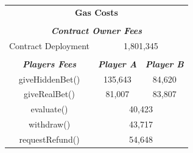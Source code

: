 \documentclass[12pt,a4paper]{article}
\begin{document}
\begin{table}[htpb]
    \begin{center}
        \begin{tabular}{ccc}
        \multicolumn{3}{c}{\textbf{Gas Costs}}                                                                                                                   \\
        \multicolumn{1}{l}{}                                 & \multicolumn{1}{l}{}                            & \multicolumn{1}{l}{}                            \\ \hline
        \multicolumn{3}{|c|}{\textit{\textbf{Contract Owner Fees}}}                                                                                              \\ \hline
        \multicolumn{1}{|c|}{Contract Deployment}            & \multicolumn{2}{c|}{1,801,345}                                                                    \\ \hline
        \multicolumn{1}{l}{}                                 & \multicolumn{1}{l}{}                            & \multicolumn{1}{l}{}                            \\ \hline
        \multicolumn{1}{|c|}{\textit{\textbf{Players Fees}}} & \multicolumn{1}{c|}{\textit{\textbf{Player A}}} & \multicolumn{1}{c|}{\textit{\textbf{Player B}}} \\ \hline
        \multicolumn{1}{|c|}{giveHiddenBet()}                & \multicolumn{1}{c|}{135,643}                    & \multicolumn{1}{c|}{84,620}                     \\ \hline
        \multicolumn{1}{|c|}{giveRealBet()}                  & \multicolumn{1}{c|}{81,007}                     & \multicolumn{1}{c|}{83,807}                     \\ \hline
        \multicolumn{1}{|c|}{evaluate()}                     & \multicolumn{2}{c|}{40,423}                                                                       \\ \hline
        \multicolumn{1}{|c|}{withdraw()}                     & \multicolumn{2}{c|}{43,717}                                                                       \\ \hline
        \multicolumn{1}{|c|}{requestRefund()}                & \multicolumn{2}{c|}{54,648}                                                                       \\ \hline
        \end{tabular}
    \end{center}
\end{table}
\end{document}
